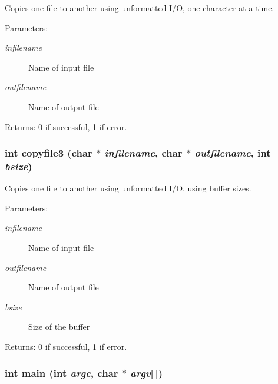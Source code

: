 Copies one file to another using unformatted I/O, one character at a time. \begin{Desc}
\item[Parameters:]
\begin{description}
\item[{\em infilename}]Name of input file \item[{\em outfilename}]Name of output file \end{description}
\end{Desc}
\begin{Desc}
\item[Returns:]0 if successful, 1 if error. \end{Desc}
\subsubsection{\setlength{\rightskip}{0pt plus 5cm}int copyfile3 (char $\ast$ {\em infilename}, char $\ast$ {\em outfilename}, int {\em bsize})}\label{cptest1_8c_f2643a5d96c55625c22762e806920280}


Copies one file to another using unformatted I/O, using buffer sizes. \begin{Desc}
\item[Parameters:]
\begin{description}
\item[{\em infilename}]Name of input file \item[{\em outfilename}]Name of output file \item[{\em bsize}]Size of the buffer \end{description}
\end{Desc}
\begin{Desc}
\item[Returns:]0 if successful, 1 if error. \end{Desc}
\subsubsection{\setlength{\rightskip}{0pt plus 5cm}int main (int {\em argc}, char $\ast$ {\em argv}[$\,$])}\label{cptest1_8c_28052c36c3b61c6c0eaa18f5d226118f}


